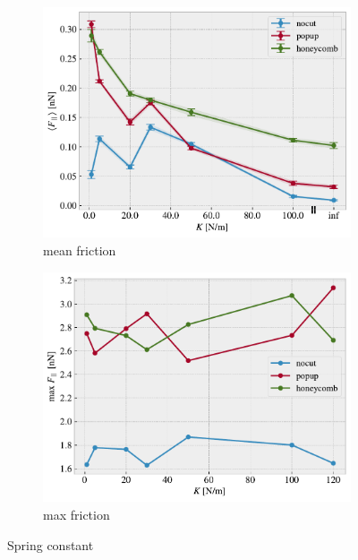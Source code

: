 \begin{figure}[H]
  \centering
  \begin{subfigure}[b]{0.49\textwidth}
      \centering
      \includegraphics[width=\textwidth]{figures/baseline/variables_spring_mean.pdf}
      \caption{mean friction}
      \label{fig:var_K_mean}
  \end{subfigure}
  \hfill
  \begin{subfigure}[b]{0.49\textwidth}
      \centering
      \includegraphics[width=\textwidth]{figures/baseline/variables_spring_max.pdf}
      \caption{max friction}
      \label{fig:var_K_max}
  \end{subfigure}
  \hfill
     \caption{Spring constant}
     \label{fig:var_K}
\end{figure}

